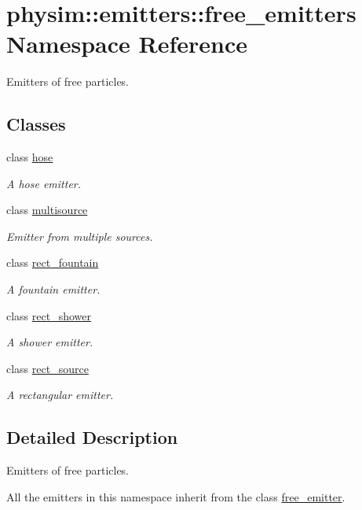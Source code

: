 \hypertarget{namespacephysim_1_1emitters_1_1free__emitters}{}\section{physim\+:\+:emitters\+:\+:free\+\_\+emitters Namespace Reference}
\label{namespacephysim_1_1emitters_1_1free__emitters}


Emitters of free particles.  


\subsection*{Classes}
\begin{DoxyCompactItemize}
\item 
class \hyperlink{classphysim_1_1emitters_1_1free__emitters_1_1hose}{hose}
\begin{DoxyCompactList}\small\item\em A hose emitter. \end{DoxyCompactList}\item 
class \hyperlink{classphysim_1_1emitters_1_1free__emitters_1_1multisource}{multisource}
\begin{DoxyCompactList}\small\item\em Emitter from multiple sources. \end{DoxyCompactList}\item 
class \hyperlink{classphysim_1_1emitters_1_1free__emitters_1_1rect__fountain}{rect\+\_\+fountain}
\begin{DoxyCompactList}\small\item\em A fountain emitter. \end{DoxyCompactList}\item 
class \hyperlink{classphysim_1_1emitters_1_1free__emitters_1_1rect__shower}{rect\+\_\+shower}
\begin{DoxyCompactList}\small\item\em A shower emitter. \end{DoxyCompactList}\item 
class \hyperlink{classphysim_1_1emitters_1_1free__emitters_1_1rect__source}{rect\+\_\+source}
\begin{DoxyCompactList}\small\item\em A rectangular emitter. \end{DoxyCompactList}\end{DoxyCompactItemize}


\subsection{Detailed Description}
Emitters of free particles. 

All the emitters in this namespace inherit from the class \hyperlink{classphysim_1_1emitters_1_1free__emitter}{free\+\_\+emitter}. 